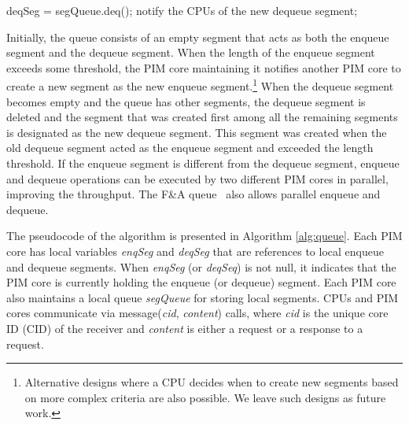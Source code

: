 \begin{algorithm*}[ht!]
{\begin{multicols}{2}
\begin{algorithmic}[1]
\algrestore{}
	\State deqSeg = segQueue.deq();
	\State notify the CPUs of the new dequeue segment; 
\EndProcedure
\end{algorithmic}

\end{multicols}
}
\vspace{-2ex}
\end{algorithm*}

Initially, the queue consists of an empty segment that acts as both the enqueue segment and 
the dequeue segment. 
When the length of the enqueue segment exceeds some threshold, the PIM core maintaining it
notifies another PIM core to create a new segment as the new enqueue segment.\footnote{
Alternative designs where a CPU decides when to create new segments based on more complex 
criteria are also possible. 
We leave such designs as future work. }
When the dequeue segment becomes empty and the queue has other segments, 
the dequeue segment is deleted and the segment that was created first 
among all the remaining segments is designated as the new dequeue segment. 
This segment was created when the old dequeue segment 
acted as the enqueue segment and exceeded the length threshold.
If the enqueue segment is different from the dequeue segment, 
enqueue and dequeue operations can be executed by two different PIM cores 
in parallel, improving the throughput. 
The F\&A queue~\cite{Morrison13} also allows parallel enqueue and dequeue. 

The pseudocode of the algorithm is presented in Algorithm \ref{alg:queue}. 
Each PIM core has local variables \textit{enqSeg} and \textit{deqSeg} that are references to 
local enqueue and dequeue segments.
When \textit{enqSeg} (or \textit{deqSeq}) is not null, it indicates that the PIM core is currently 
holding the enqueue (or dequeue) segment.
Each PIM core also maintains a local queue \textit{segQueue} for storing local segments.
CPUs and PIM cores communicate via message(\textit{cid}, \textit{content}) calls, 
where \textit{cid} is the unique core ID (CID) 
of the receiver and \textit{content} is either a request or a response to a request.

